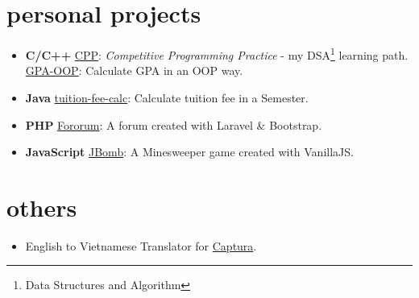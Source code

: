\documentclass{article}
\begin{document}
\section{personal projects}
\begin{multicols}{2}
\begin{itemize}
\item \textbf{C/C++}
\subitem \href{https://github.com/trhgquan/CPP}{CPP}: \textit{Competitive Programming Practice} - my DSA\footnote{Data Structures and Algorithm} learning path.
\subitem \href{https://github.com/trhgquan/GPA-OOP}{GPA-OOP}: Calculate GPA in an OOP way.
\item \textbf{Java}
\subitem \href{https://github.com/trhgquan/tuition-fee-calc}{tuition-fee-calc}: Calculate tuition fee in a Semester.
\columnbreak
\item \textbf{PHP}
\subitem \href{https://github.com/trhgquan/Fororum}{Fororum}: A forum created with Laravel \& Bootstrap.
\item \textbf{JavaScript}
\subitem \href{https://github.com/trhgquan/JBomb}{JBomb}: A Minesweeper game created with VanillaJS.
\end{itemize}
\end{multicols}

\section{others}
\begin{itemize}
\item English to Vietnamese Translator for \href{https://github.com/MathewSachin/Captura}{Captura}.
\end{itemize}
\end{document}
